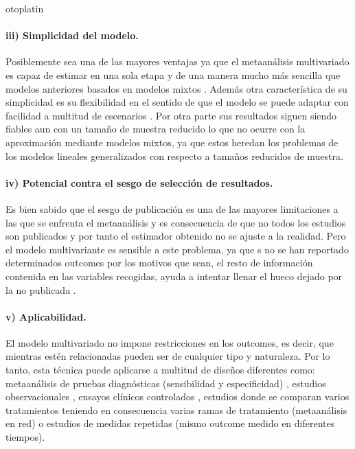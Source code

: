 otoplatin\documentclass[a4paper,openright,12pt]{report}
\begin{document}
\paragraph{iii) Simplicidad del modelo.} Posiblemente sea una de las mayores ventajas ya que el metaanálisis multivariado es capaz de estimar en una sola etapa \cite{Jackson2011} y de una manera mucho más sencilla que modelos anteriores basados en modelos mixtos \cite{Berkey1996}\cite{Berkey1998}. Además otra característica de su simplicidad es su flexibilidad en el sentido de que el modelo se puede adaptar con facilidad a multitud de escenarios \cite{Nam2003}. Por otra parte sus resultados siguen siendo fiables aun con un tamaño de muestra reducido \cite{Nam2003} lo que no ocurre con la aproximación mediante modelos mixtos, ya que estos heredan los problemas de los modelos lineales generalizados con respecto a tamaños reducidos de muestra.
\paragraph{iv) Potencial contra el sesgo de selección de resultados.} Es bien sabido que el sesgo de publicación es una de las mayores limitaciones a las que se enfrenta el metaanálisis y es consecuencia de que no todos los estudios son publicados y por tanto el estimador obtenido no se ajuste a la realidad. Pero el modelo multivariante es sensible a este problema, ya que s no se han reportado determinados outcomes por los motivos que sean, el resto de información contenida en las variables recogidas, ayuda a intentar llenar el hueco dejado por la no publicada \cite{Riley2007}.
\paragraph{v) Aplicabilidad.} El modelo multivariado no impone restricciones en los outcomes, es decir, que mientras estén relacionadas pueden ser de cualquier tipo y naturaleza. Por lo tanto, esta técnica puede aplicarse a multitud de diseños diferentes como: metaanálisis de pruebas diagnósticas (sensibilidad y especificidad) \cite{Jackson2011}, estudios observacionales \cite{Jackson2011}, ensayos clínicos controlados \cite{Jackson2011}\cite{Nam2003}, estudios donde se comparan varios tratamientos teniendo en consecuencia varias ramas de tratamiento (metaanálisis en red) \cite{Jackson2011}\cite{Nam2003} o estudios de medidas repetidas (mismo outcome medido en diferentes tiempos).
\newpage
\end{document}
